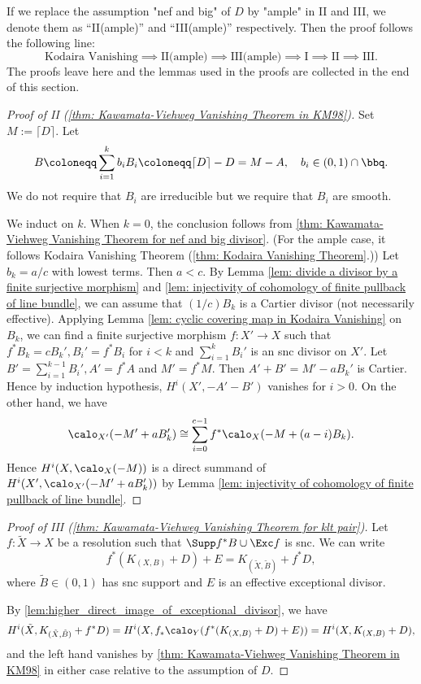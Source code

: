     If we replace the assumption "nef and big" of \(D\) by "ample" in II and III, we denote them as ``II(ample)'' and ``III(ample)'' respectively.
    Then the proof follows the following line:
    \[ \text{Kodaira Vanishing} \implies \text{II(ample)} \implies \text{III(ample)} \implies \text{I} \implies \text{II} \implies \text{III}. \]
    The proofs leave here and the lemmas used in the proofs are collected in the end of this section.
    
    \begin{proof}[Proof of II (\cref{thm: Kawamata-Viehweg Vanishing Theorem in KM98})]
        Set \(M:= \lceil D \rceil\).
        Let 
        \[ B \coloneqq \sum_{i=1}^k b_i B_i \coloneqq \lceil D \rceil - D = M - A, \quad b_i \in (0,1) \cap \bbq. \]
        We do not require that \(B_i\) are irreducible but we require that \(B_i\) are smooth.

        We induct on \(k\).
        When \(k = 0\), the conclusion follows from \cref{thm: Kawamata-Viehweg Vanishing Theorem for nef and big divisor}.
        (For the ample case, it follows Kodaira Vanishing Theorem (\cref{thm: Kodaira Vanishing Theorem}.))
        Let \(b_k = a/c\) with lowest terms.
        Then \(a<c\).
        By Lemma \ref{lem: divide a divisor by a finite surjective morphism} and \ref{lem: injectivity of cohomology of finite pullback of line bundle}, we can assume that \((1/c)B_k\) is a Cartier divisor (not necessarily effective).
        Applying Lemma \ref{lem: cyclic covering map in Kodaira Vanishing} on \(B_k\),
        we can find a finite surjective morphism \(f: X' \to X\) such that \(f^*B_k = cB_k', B_i' = f^*B_i\) for \(i < k\) and \(\sum_{i=1}^{k} B_i'\) is an snc divisor on \(X'\).
        Let \(B' = \sum_{i=1}^{k-1}B_i', A' = f^*A\) and \(M' = f^*M\).
        Then \(A'+ B' =  M'-aB_k'\) is Cartier.
        Hence by induction hypothesis, \( H^i(X', -A' - B')\) vanishes for \(i > 0\).
        On the other hand, we have
        \[ \calo_{X'}(-M' + aB_k') \cong \sum_{i=0}^{c-1} f^*\calo_X(-M + (a-i) B_k). \]
        Hence \(H^i(X,\calo_X(-M))\) is a direct summand of \(H^i(X', \calo_{X'}(-M' + aB_k'))\) by Lemma \ref{lem: injectivity of cohomology of finite pullback of line bundle}.
    \end{proof}
    \begin{proof}[Proof of III (\cref{thm: Kawamata-Viehweg Vanishing Theorem for klt pair})]
        Let \(f: \tilde{X} \to X\) be a resolution such that \(\Supp f^*B \cup \Exc f\) is snc.
        We can write
        \[ f^*(K_{(X,B)} + D) + E = K_{(\tilde{X},\tilde{B})} + f^*D, \]
        where \(\tilde{B} \in (0,1)\) has snc support and \(E\) is an effective exceptional divisor.

        By \cref{lem:higher_direct_image_of_exceptional_divisor}, we have 
        \[ H^i(\tilde{X}, K_{(\tilde{X},\tilde{B})} + f^*D) = H^i(X, f_*\calo_Y(f^*(K_{(X,B)}+D)+E)) = H^i(X, K_{(X,B)}+D), \] 
        and the left hand vanishes by \cref{thm: Kawamata-Viehweg Vanishing Theorem in KM98} in either case relative to the assumption of \(D\).
    \end{proof}
